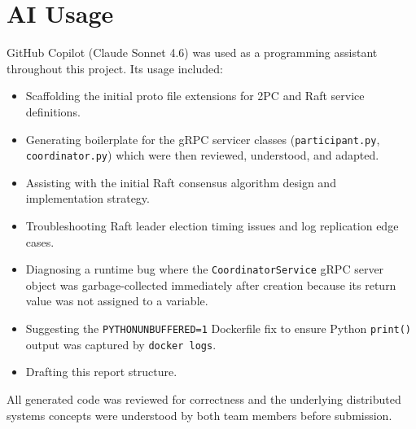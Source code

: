 \section{AI Usage}

GitHub Copilot (Claude Sonnet 4.6) was used as a programming assistant
throughout this project. Its usage included:

\begin{itemize}
  \item Scaffolding the initial proto file extensions for 2PC and Raft service definitions.
  \item Generating boilerplate for the gRPC servicer classes (\texttt{participant.py},
        \texttt{coordinator.py}) which were then reviewed, understood, and adapted.
  \item Assisting with the initial Raft consensus algorithm design and implementation strategy.
  \item Troubleshooting Raft leader election timing issues and log replication edge cases.
  \item Diagnosing a runtime bug where the \texttt{CoordinatorService} gRPC server
        object was garbage-collected immediately after creation because its return
        value was not assigned to a variable.
  \item Suggesting the \texttt{PYTHONUNBUFFERED=1} Dockerfile fix to ensure
        Python \texttt{print()} output was captured by \texttt{docker logs}.
  \item Drafting this report structure.
\end{itemize}

All generated code was reviewed for correctness and the underlying distributed
systems concepts were understood by both team members before submission.
